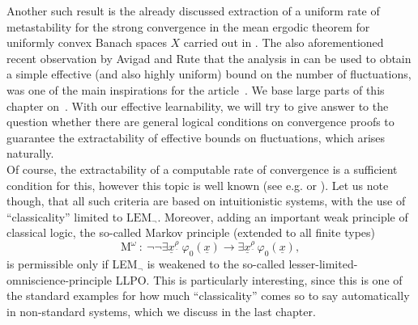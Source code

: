 Another such result is the already discussed extraction of a 
uniform rate of metastability for the strong convergence in the mean 
ergodic theorem for uniformly convex Banach spaces $X$ carried out in 
\cite{kohlenbachleustean09}. The also aforementioned recent
observation by Avigad and Rute \cite{Avigad/Rute} that the analysis 
in \cite{kohlenbachleustean09} can be used to obtain a simple effective (and 
also highly uniform) 
bound on the number of fluctuations, was one of the
main inspirations for the article~\cite{KS13}. We base
large parts of this chapter on~\cite{KS13}. With our effective learnability, we will try 
to give answer to the question whether there are general logical conditions on 
convergence proofs to guarantee the extractability of effective bounds 
on fluctuations, which arises naturally.\\
Of course, the extractability of 
a computable rate of convergence is a sufficient condition for this, however this
topic is well known (see e.g. \cite{Kohlenbach08} or \cite{GerKoh06}).
Let us note though, that all such criteria are based on intuitionistic
systems, with the use of ``classicality'' limited to $\mbox{LEM$_\neg$} $.
Moreover, adding an important weak principle of classical logic,
the so-called Markov principle (extended to all finite types)
\[ \mbox{M}^{\omega}\ :\ 
\neg\neg\exists \underline{x}^{\underline{\rho}} \ \varphi_0(\underline{x})\to 
\exists \underline{x}^{\underline{\rho}}\,\varphi_0(\underline{x}), \] 
is permissible only if LEM$_{\neg}$ is weakened to the so-called lesser-limited-omniscience-principle 
LLPO. This is particularly interesting, since this is one of the standard
examples for how much ``classicality'' comes so to say automatically in non-standard systems,
which we discuss in the last chapter.


